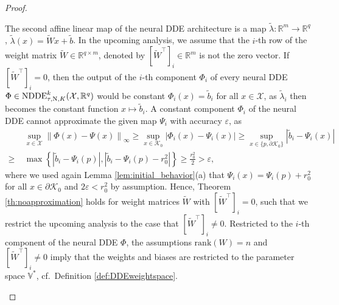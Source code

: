 \documentclass[10pt]{article}
\numberwithin{equation}{section}
\newcommand{\eps}{\varepsilon}
\newcommand\norm[1]{\left\lVert#1\right\rVert}
\newcommand\abs[1]{\left\lvert#1\right\rvert}
\begin{document}
\begin{proof}
\begin{enumerate}
			The second affine linear map of the neural DDE architecture is a map $\tilde{\lambda}: \mathbb{R}^m \rightarrow \mathbb{R}^q$, $\tilde \lambda (x) = \widetilde{W} x + \tilde b$. In the upcoming analysis, we assume that the $i$-th row of the weight matrix $\widetilde{W} \in \mathbb{R}^{q \times m}$, denoted by $[\widetilde{W}^\top]_i \in \mathbb{R}^m$ is not the zero vector. If $[\widetilde{W}^\top]_i = 0$, then the output of the $i$-th component $\Phi_i$ of every neural DDE $\Phi\in\textup{NDDE}_{\tau,\textup{N},K}^k(\mathcal{X},\mathbb{R}^q)$ would be constant $\Phi_i(x) = \tilde b_i$ for all $x \in \mathcal{X}$, as $\tilde \lambda_i$ then becomes the constant function $x \mapsto \tilde b_i$. A constant component $\Phi_i$ of the neural DDE cannot approximate the given map $\Psi_i$ with accuracy $\eps$, as
			\begin{align*}
				&\sup_{x \in \mathcal{X}}\norm{\Phi(x)-\Psi(x)}_\infty \geq 	\sup_{x\in \mathcal{K}_0}\abs{\Phi_i(x)-\Psi_i(x)} \geq \sup_{x\in\{p,\partial \mathcal{K}_0\}}\abs{\tilde b_i-\Psi_i(x)} \\
				\geq \; & \max\left\{ \abs{\tilde b_i-\Psi_i(p)}, \abs{\tilde b_i- \Psi_i(p)-r_0^2} \right\} \geq \frac{r_0^2}{2}> \eps,
			\end{align*} 
			where we used again Lemma \ref{lem:initial_behavior}(a) that $\Psi_i(x) = \Psi_i(p)+r_0^2$ for all $x \in \partial \mathcal{K}_0$ and $2 \eps < r_0^2$ by assumption.  Hence, Theorem \ref{th:noapproximation} holds for weight matrices $\widetilde{W}$ with $[\widetilde{W}^\top]_i = 0$, such that we restrict the upcoming analysis to the case that $[\widetilde{W}^\top]_i \neq 0$. Restricted to the $i$-th component of the neural DDE $\Phi$, the assumptions $\text{rank}(W)=n$ and $[\widetilde{W}^\top]_i \neq 0$ imply that the weights and biases are restricted to the parameter space $\mathbb{V}^\ast$, cf.\ Definition \ref{def:DDEweightspace}.
			

\end{enumerate}
\end{proof}
\end{document}
